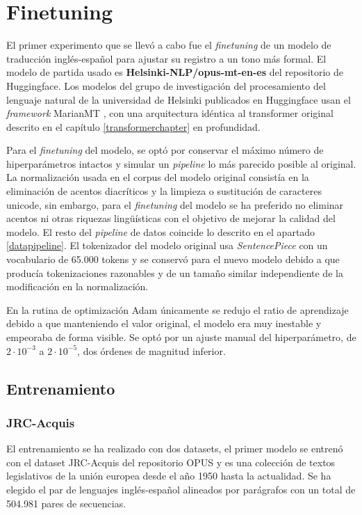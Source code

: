 \section{Finetuning}\label{finetune}
El primer experimento que se llevó a cabo fue el \textit{finetuning} de un modelo de traducción inglés-español para ajustar su registro a un tono más formal.
El modelo de partida usado es \textbf{Helsinki-NLP/opus-mt-en-es} del repositorio de Huggingface.
Los modelos del grupo de investigación del procesamiento del lenguaje natural de la universidad de Helsinki publicados en Huggingface usan el \textit{framework} MarianMT \cite{Junczys-Dowmunt2018Apr}, con una arquitectura idéntica al transformer original descrito en el capítulo \ref{transformerchapter} en profundidad.

Para el \textit{finetuning} del modelo, se optó por conservar el máximo número de hiperparámetros intactos y simular un \textit{pipeline} lo más parecido posible al original.
La normalización usada en el corpus del modelo original consistía en la eliminación de acentos diacríticos y la limpieza o sustitución de caracteres unicode, sin embargo, para el \textit{finetuning} del modelo se ha preferido no eliminar acentos ni otras riquezas ling{\"u}ísticas con el objetivo de mejorar la calidad del modelo. El resto del \textit{pipeline} de datos coincide lo descrito en el apartado \ref{datapipeline}.
El tokenizador del modelo original usa \textit{SentencePiece} con un vocabulario de 65.000 tokens y se conservó para el nuevo modelo debido a que producía tokenizaciones razonables y de un tamaño similar independiente de la modificación en la normalización.

En la rutina de optimización Adam \cite{Kingma2014Dec} únicamente se redujo el ratio de aprendizaje debido a que manteniendo el valor original, el modelo era muy inestable y empeoraba de forma visible. Se optó por un ajuste manual del hiperparámetro, de $2\cdot 10^{-3}$ a $2\cdot 10^{-5}$, dos órdenes de magnitud inferior.

\subsection{Entrenamiento}
\subsubsection{JRC-Acquis}
El entrenamiento se ha realizado con dos datasets, el primer modelo se entrenó con el dataset JRC-Acquis del repositorio OPUS \cite{CORPUS} y es una colección de textos legislativos de la unión europea desde el año 1950 hasta la actualidad. Se ha elegido el par de lenguajes inglés-español alineados por parágrafos con un total de 504.981 pares de secuencias.

